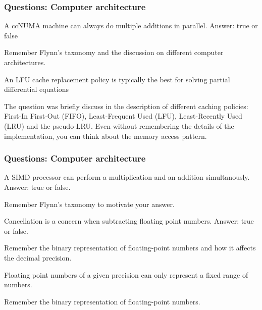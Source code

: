 \begin{frame}[fragile]
  \frametitle{Questions: Computer architecture}

\begin{ex}[2015]
A ccNUMA machine can always do multiple additions in parallel. Answer: true or false
\end{ex}

Remember Flynn's taxonomy and the discussion on different computer architectures.

\begin{ex}[2015]
An LFU cache replacement policy is typically the best for solving partial
differential equations
\end{ex}

The question was briefly discuss in the description of different caching policies: First-In First-Out (FIFO), Least-Frequent Used (LFU), Least-Recently Used (LRU) and the pseudo-LRU.
Even without remembering the details of the implementation, you can think about the memory access pattern.

\end{frame}
\begin{frame}[fragile]
  \frametitle{Questions: Computer architecture}

\begin{ex}[2015]
A SIMD processor can perform a multiplication and an addition simultanously. Answer: true or false.
\end{ex}

Remember Flynn's taxonomy to motivate your answer.

\begin{ex}[2015]
Cancellation is a concern when subtracting floating point numbers. Answer: true or false.
\end{ex}

Remember the binary representation of floating-point numbers and how it affects the decimal precision.

\begin{ex}[2014]
Floating point numbers of a given precision can only represent a fixed range
of numbers.
\end{ex}

Remember the binary representation of floating-point numbers.

\end{frame}

